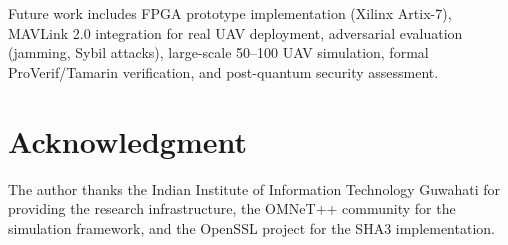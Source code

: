 \documentclass[11pt,a4paper]{article}
\begin{document}
Future work includes FPGA prototype implementation (Xilinx Artix-7), MAVLink 2.0 integration for real UAV deployment, adversarial evaluation (jamming, Sybil attacks), large-scale 50--100 UAV simulation, formal ProVerif/Tamarin verification, and post-quantum security assessment.


\section*{Acknowledgment}

The author thanks the Indian Institute of Information Technology Guwahati for providing the research infrastructure, the OMNeT++ community for the simulation framework, and the OpenSSL project for the SHA3 implementation.



\end{document}
